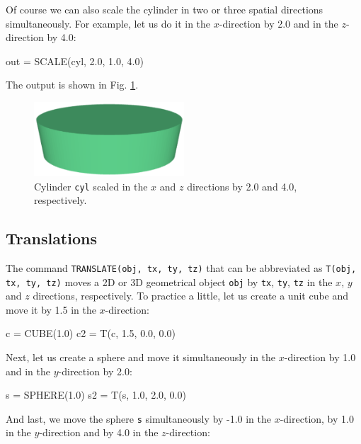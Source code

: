 Of course we can also scale the cylinder in two or three spatial directions 
simultaneously. For example, let us do it in the $x$-direction 
by 2.0 and in the $z$-direction by 4.0:

\begin{bluecode}
out = SCALE(cyl, 2.0, 1.0, 4.0)
\end{bluecode}
The output is shown in Fig. \ref{fig:scale-4}.


\begin{figure}[!ht]
\begin{center}
\includegraphics[width=0.5\textwidth]{img/scale-4.png}
\end{center}
\vspace{-4mm}
\caption{Cylinder {\tt cyl} scaled in the $x$ and $z$ directions by 2.0 and 4.0, respectively.}
\label{fig:scale-4}
\vspace{-1cm}
\end{figure}
\newpage

\subsection{Translations} \label{sec:translate}

The command {\tt TRANSLATE(obj, tx, ty, tz)} that can be abbreviated as 
{\tt T(obj, tx, ty, tz)} moves a 2D or 3D geometrical object {\tt obj} by {\tt tx}, {\tt ty},
{\tt tz} in the $x$, $y$ and $z$ directions, respectively. To practice
a little, let us create a unit cube and move it by 1.5 in the $x$-direction:

\begin{bluecode}
c = CUBE(1.0)
c2 = T(c, 1.5, 0.0, 0.0)
\end{bluecode}
Next, let us create a sphere and move it simultaneously 
in the $x$-direction by 1.0 and in the $y$-direction by 2.0:

\begin{bluecode}
s = SPHERE(1.0)
s2 = T(s, 1.0, 2.0, 0.0)
\end{bluecode}
And last, we move the sphere {\tt s} simultaneously by -1.0 in the $x$-direction, 
by 1.0 in the $y$-direction and by 4.0 in the $z$-direction:


